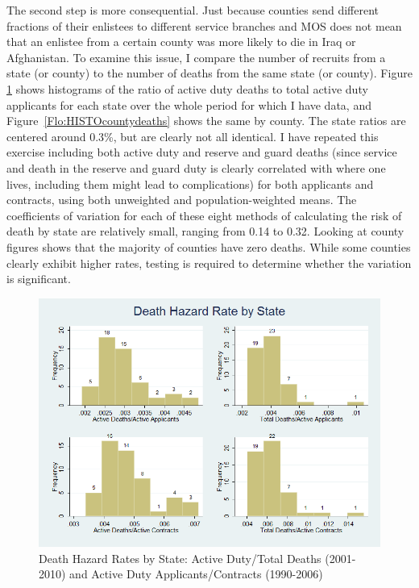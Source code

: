 \documentclass[12pt] {article}
\begin{document}
The second step is more consequential. Just because counties send different fractions of their enlistees to different service branches and MOS does not mean that an enlistee from a certain county was more likely to die in Iraq or Afghanistan. To examine this issue, I compare the number of recruits from a state (or county) to the number of deaths from the same state (or county). Figure \ref{Flo:HISTOstatedeaths} shows histograms of the ratio of active duty deaths to total active duty applicants for each state over the whole period for which I have data, and  Figure~\ref{Flo:HISTOcountydeaths} shows the same by county. The state ratios are centered around 0.3\%, but are clearly not all identical. I have repeated this exercise including both active duty and reserve and guard deaths (since service and death in the reserve and guard duty is clearly correlated with where one lives, including them might lead to complications) for both applicants and contracts, using both unweighted and population-weighted means. The coefficients of variation for each
of these eight methods of calculating the risk of death by state are
relatively small, ranging from 0.14 to 0.32. Looking at county figures shows that the majority of counties have zero deaths. While some counties clearly exhibit higher rates, testing is required to determine whether the variation is significant. 

\begin{figure}
\includegraphics[scale=0.5]{../Output/hist_state_combined.png}
\caption{Death Hazard Rates by State: Active Duty/Total Deaths (2001-2010) and Active Duty Applicants/Contracts (1990-2006)}
\label{Flo:HISTOstatedeaths}
\end{figure}
\end{document}
